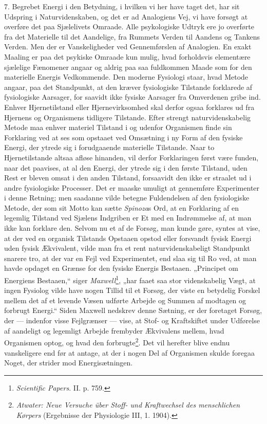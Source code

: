\documentclass[12pt,a4paper]{book}
\newcommand{\opage}[1]{\marginnote{\footnotesize\textit{[#1]}}}
\begin{document}
7. Begrebet Energi i den Betydning, i hvilken vi her have taget det,
har sit Udspring i Naturvidenskaben, og det er ad Analogiens Vej, vi
have forsøgt at overføre det paa Sjælelivets Omraade. Alle
psykologiske Udtryk ere jo overførte fra det Materielle til det
Aandelige, fra Rummets Verden til Aandens og Tankens Verden. Men der
er Vanskeligheder ved Gennemførslen af Analogien. En exakt Maaling er
paa det psykiske Omraade kun mulig, hvad forholdsvis elementære
sjælelige Fænomener angaar og aldrig paa saa fuldkommen Maade som for
den materielle Energis Vedkommende. Den moderne Fysiologi staar, hvad
Metode angaar, paa det Standpunkt, at den kræver fysiologiske
Tilstande forklarede af fysiologiske Aarsager, for%
\opage{23}saavidt ikke fysiske
Aarsager fra Omverdenen gribe ind. Enhver Hjernetilstand eller
Hjernevirksomhed skal derfor ogsaa forklares ud fra Hjernens og
Organismens tidligere Tilstande. Efter strengt naturvidenskabelig
Metode maa enhver materiel Tilstand i og udenfor Organismen finde sin
Forklaring ved at ses som opstaaet ved Omsætning i ny Form af den
fysiske Energi, der ytrede sig i forudgaaende materielle Tilstande.
Naar to Hjernetilstande altsaa afløse hinanden, vil derfor Forklaringen
først være funden, naar det paavises, at al den Energi, der ytrede sig
i den første Tilstand, uden Rest er bleven omsat i den anden Tilstand,
forsaavidt den ikke er straalet ud i andre fysiologiske Processer. Det
er maaske umuligt at gennemføre Experimenter i denne Retning; men
saadanne vilde betegne Fuldendelsen af den fysiologiske Metode, der
som sit Motto kan sætte \emph{Spinoza}s Ord, at en Forklaring af en
legemlig Tilstand ved Sjælens Indgriben er Et med en Indrømmelse af,
at man ikke kan forklare den. Selvom nu et af de Forsøg, man kunde
gøre, syntes at vise, at der ved en organisk Tilstands Opstaaen opstod
eller forsvandt fysisk Energi uden fysisk Ækvivalent, vilde man fra et
rent naturvidenskabeligt Standpunkt snarere tro, at der var en Fejl
ved Experimentet, end slaa sig til Ro ved, at man havde opdaget en
Grænse for den fysiske Energis Bestaaen. „Principet om Energiens
Bestaaen,“ siger \emph{Maxwell}\footnote{\emph{Scientific Papers}. II.
p. 759.}, „har faaet saa stor videnskabelig Vægt, at ingen Fysiolog
vilde have nogen Tillid til et Forsøg, der viste en betydelig Forskel
mellem det af et levende Væsen udførte Arbejde og Summen af modtagen
og forbrugt Energi.“ Siden Maxwell nedskrev denne Sætning, er der
foretaget Forsøg, der --- indenfor visse Fejlgrænser --- vise, at
Stof- og Kraftskiftet under Udførelse af aandeligt og legemligt
Arbejde frembyder Ækvivalens mellem, hvad Organismen optog, og hvad
den forbrugte\footnote{\emph{Atwater: Neue Versuche über Stoff- und
Kraftwechsel des menschlichen Kørpers} (Ergebnisse der Physiologie
III, 1. 1904).}. Det vil herefter blive endnu vanskeligere end før at
antage, at der i nogen Del af Organismen skulde foregaa Noget, der
strider mod Energisætningen.
\end{document}

